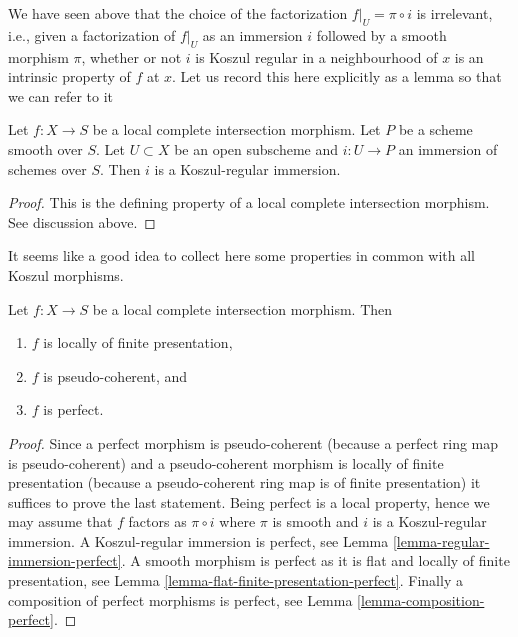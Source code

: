\noindent
We have seen above that the choice of the factorization
$f|_U = \pi \circ i$ is irrelevant, i.e., given a factorization
of $f|_U$ as an immersion $i$ followed by a smooth morphism $\pi$, whether or
not $i$ is Koszul regular in a neighbourhood of $x$ is an intrinsic
property of $f$ at $x$. Let us record this here explicitly as a lemma
so that we can refer to it

\begin{lemma}
\label{lemma-lci}
Let $f : X \to S$ be a local complete intersection morphism.
Let $P$ be a scheme smooth over $S$. Let $U \subset X$ be an open subscheme
and $i : U \to P$ an immersion of schemes over $S$.
Then $i$ is a Koszul-regular immersion.
\end{lemma}

\begin{proof}
This is the defining property of a local complete intersection
morphism. See discussion above.
\end{proof}

\noindent
It seems like a good idea to collect here some properties in common
with all Koszul morphisms.

\begin{lemma}
\label{lemma-lci-properties}
Let $f : X \to S$ be a local complete intersection morphism.
Then
\begin{enumerate}
\item $f$ is locally of finite presentation,
\item $f$ is pseudo-coherent, and
\item $f$ is perfect.
\end{enumerate}
\end{lemma}

\begin{proof}
Since a perfect morphism is pseudo-coherent
(because a perfect ring map is pseudo-coherent)
and a pseudo-coherent morphism is locally of finite presentation
(because a pseudo-coherent ring map is of finite presentation)
it suffices to prove the last statement. Being perfect is a local
property, hence we may assume that $f$ factors as $\pi \circ i$ where
$\pi$ is smooth and $i$ is a Koszul-regular immersion.
A Koszul-regular immersion is perfect, see
Lemma \ref{lemma-regular-immersion-perfect}.
A smooth morphism is perfect as it is flat and locally of finite
presentation, see
Lemma \ref{lemma-flat-finite-presentation-perfect}.
Finally a composition of perfect morphisms is perfect, see
Lemma \ref{lemma-composition-perfect}.
\end{proof}

